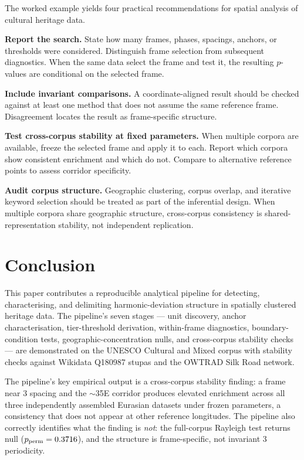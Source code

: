 \documentclass[12pt,a4paper]{article}
\newcommand{\degr}{\ifmmode{^\circ}\else\textdegree{}\fi}
\begin{document}
The worked example yields four practical recommendations for spatial
analysis of cultural heritage data.

\textbf{Report the search.} State how many frames, phases, spacings,
anchors, or thresholds were considered. Distinguish frame selection from
subsequent diagnostics. When the same data select the frame and test it,
the resulting $p$-values are conditional on the selected frame.

\textbf{Include invariant comparisons.} A coordinate-aligned result
should be checked against at least one method that does not assume the
same reference frame. Disagreement locates the result as frame-specific
structure.

\textbf{Test cross-corpus stability at fixed parameters.} When multiple
corpora are available, freeze the selected frame and apply it to each.
Report which corpora show consistent enrichment and which do not.
Compare to alternative reference points to assess corridor specificity.

\textbf{Audit corpus structure.} Geographic clustering, corpus overlap,
and iterative keyword selection should be treated as part of the
inferential design. When multiple corpora share geographic structure,
cross-corpus consistency is shared-representation stability, not
independent replication.

\section{Conclusion}
\label{sec:conclusion}

This paper contributes a reproducible analytical pipeline for detecting,
characterising, and delimiting harmonic-deviation structure in spatially
clustered heritage data. The pipeline's seven stages — unit discovery,
anchor characterisation, tier-threshold derivation, within-frame
diagnostics, boundary-condition tests, geographic-concentration nulls,
and cross-corpus stability checks — are demonstrated on the UNESCO
Cultural and Mixed corpus with stability checks against Wikidata
Q180987 stupas and the OWTRAD Silk Road network.

The pipeline's key empirical output is a cross-corpus stability finding:
a frame near 3\degr{} spacing and the $\sim$35\degr{}E corridor
produces elevated enrichment across all three independently assembled
Eurasian datasets under frozen parameters, a consistency that does not
appear at other reference longitudes. The pipeline also correctly
identifies what the finding is \emph{not}: the full-corpus Rayleigh test
returns null ($p_{\mathrm{perm}} = 0.3716$), and the
structure is frame-specific, not invariant 3\degr{} periodicity.
\end{document}

